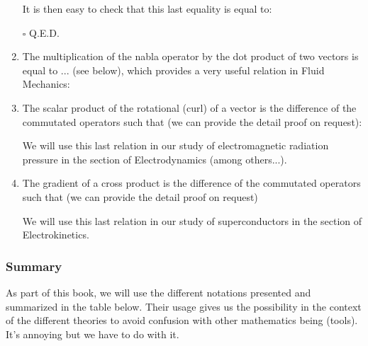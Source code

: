 \begin{enumerate}
		\begin{dem}
		
		It is then easy to check that this last equality is equal to:
		
		\begin{flushright}
			$\square$  Q.E.D.
		\end{flushright}
		\end{dem}
		
		\item The multiplication of the nabla operator by the dot product of two vectors is equal to ... (see below), which provides a very useful relation in Fluid Mechanics:
		
		
		\item The scalar product of the rotational (curl) of a vector is the difference of the commutated operators such that (we can provide the detail proof on request):
		
		We will use this last relation in our study of electromagnetic radiation pressure in the section of Electrodynamics (among others...).
		
		\item The gradient of a cross product is the difference of the commutated operators such that (we can provide the detail proof on request)
		
		We will use this last relation in our study of superconductors in the section of Electrokinetics.
	\end{enumerate}
	
	\pagebreak
	\subsubsection{Summary}
	As part of this book, we will use the different notations presented and summarized in the table below. Their usage gives us the possibility in the context of the different theories to avoid confusion with other mathematics being (tools). It's annoying but we have to do with it.
	
